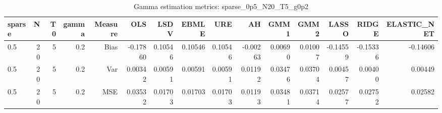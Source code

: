\begin{table}[!htbp]\centering
\caption{Gamma estimation metrics: sparse_0p5_N20_T5_g0p2}
\label{tab:table1_sparse_0p5_N20_T5_g0p2}
\begin{tabular}{lrrrrrrrrrrrrrr}
\hline
sparse & N & T0 & gamma & Measure & OLS & LSDV & EBMLE & URE & AH & GMM1 & GMM2 & LASSO & RIDGE & ELASTIC_NET \\
\hline
0.5 & 20 & 5 & 0.2 & Bias & -0.17860 & 0.10546 & 0.10546 & 0.10546 & -0.00263 & 0.00690 & 0.01007 & -0.14559 & -0.15336 & -0.14606 \\
0.5 & 20 & 5 & 0.2 & Var & 0.00342 & 0.00591 & 0.00591 & 0.00591 & 0.01192 & 0.03476 & 0.03704 & 0.00457 & 0.00400 & 0.00449 \\
0.5 & 20 & 5 & 0.2 & MSE & 0.03532 & 0.01703 & 0.01703 & 0.01703 & 0.01193 & 0.03481 & 0.03714 & 0.02577 & 0.02752 & 0.02582 \\
\hline
\end{tabular}
\end{table}

